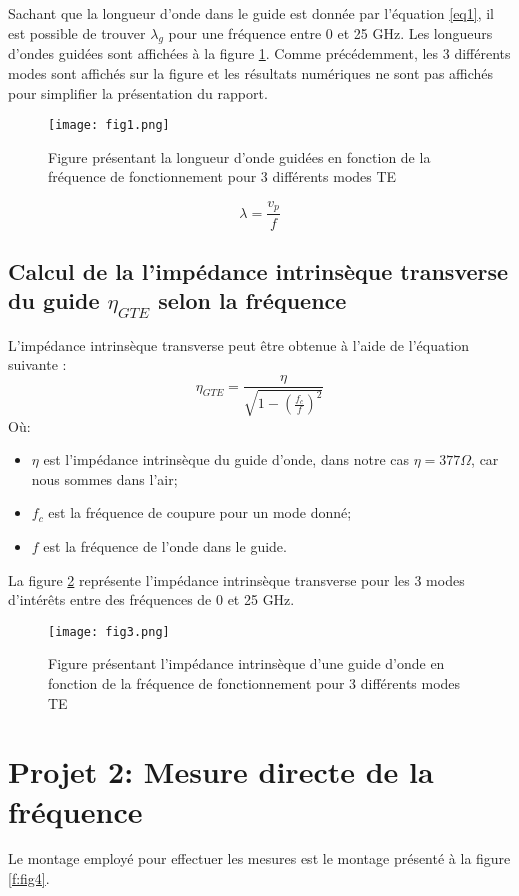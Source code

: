 Sachant que la longueur d'onde dans le guide est donnée par l'équation \ref{eq1}, il est possible de trouver $\lambda_g$ pour une fréquence entre 0 et 25 GHz. Les longueurs d'ondes guidées sont affichées à la figure \ref{fig2}. Comme précédemment, les 3 différents modes sont affichés sur la figure et les résultats numériques ne sont pas affichés pour simplifier la présentation du rapport.

\begin{figure}[htbp]
    \centering
    \texttt{[image: fig1.png]}
    \caption{Figure présentant la longueur d'onde guidées en fonction de la fréquence de fonctionnement pour 3 différents modes TE}
    \label{fig2}
\end{figure}

\begin{equation}
	\label{eq1}
	\lambda = \frac{v_p}{f}
\end{equation}

\subsection{Calcul de la l'impédance intrinsèque transverse du guide $\eta_{GTE}$ selon la fréquence}
L'impédance intrinsèque transverse peut être obtenue à l'aide de l'équation suivante :
\begin{equation}
	\eta_{GTE} = \frac{\eta}{\sqrt{1-\left(\frac{f_c}{f}\right)^2}}
\end{equation}
Où:
\begin{itemize}
	\item $\eta$ est l'impédance intrinsèque du guide d'onde, dans notre cas $\eta = 377\Omega$, car nous sommes dans l'air;
	\item $f_c$ est la fréquence de coupure pour un mode donné;
	\item $f$ est la fréquence de l'onde dans le guide.
\end{itemize}

La figure \ref{fig3} représente l'impédance intrinsèque transverse pour les 3 modes d'intérêts entre des fréquences de 0 et 25 GHz.

\begin{figure}[htbp]
    \centering
    \texttt{[image: fig3.png]}
    \caption{Figure présentant l'impédance intrinsèque d'une guide d'onde en fonction de la fréquence de fonctionnement pour 3 différents modes TE}
    \label{fig3}
\end{figure}


\section{Projet 2: Mesure directe de la fréquence}
Le montage employé pour effectuer les mesures est le montage présenté à la figure \ref{f:fig4}.

